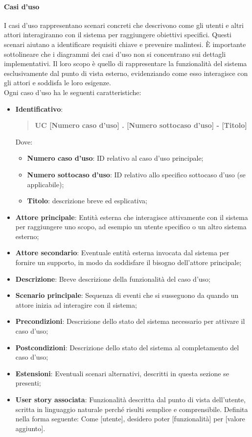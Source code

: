     \paragraph{Casi d'uso}
    I casi d’uso rappresentano scenari concreti che descrivono come gli utenti e altri attori interagiranno con il sistema per raggiungere obiettivi specifici. Questi scenari aiutano a identificare requisiti chiave e prevenire malintesi. È importante sottolineare che i diagrammi dei casi d’uso non si concentrano sui dettagli implementativi. Il loro scopo è quello di rappresentare la funzionalità del sistema esclusivamente dal punto di vista esterno, evidenziando come esso interagisce con gli attori e soddisfa le loro esigenze.\\
    \medskip
    Ogni caso d'uso ha le seguenti caratteristiche:
    
    \begin{itemize}
    \item \textbf{Identificativo}:
    \begin{quote}
    \textbf{UC [Numero caso d’uso] . [Numero sottocaso d’uso] - [Titolo]}
    \end{quote}
    Dove:
    \begin{itemize}
        \item \textbf{Numero caso d’uso}: ID relativo al caso d'uso principale;
        \item \textbf{Numero sottocaso d’uso}: ID relativo allo specifico sottocaso d'uso (se applicabile);
        \item \textbf{Titolo}: descrizione breve ed esplicativa;
    \end{itemize}

    \item \textbf{Attore principale}: Entità esterna che interagisce attivamente con il sistema per raggiungere uno scopo, ad esempio un utente specifico o un altro sistema esterno;
    \item \textbf{Attore secondario}: Eventuale entità esterna invocata dal sistema per fornire un supporto, in modo da soddisfare il bisogno dell’attore principale;
    \item \textbf{Descrizione}: Breve descrizione della funzionalità del caso d’uso;
    \item \textbf{Scenario principale}: Sequenza di eventi che si susseguono da quando un attore inizia ad interagire con il sistema;
    \item \textbf{Precondizioni}: Descrizione dello stato del sistema necessario per attivare il caso d’uso;
    \item \textbf{Postcondizioni}: Descrizione dello stato del sistema al completamento del caso d’uso;
    \item \textbf{Estensioni}: Eventuali scenari alternativi, descritti in questa sezione se presenti;
    \item \textbf{User story associata}: Funzionalità descritta dal punto di vista dell'utente, scritta in linguaggio naturale perché risulti semplice e comprensibile. Definita nella forma seguente: \newline
    Come [utente], desidero poter [funzionalità] per [valore aggiunto].
\end{itemize}

